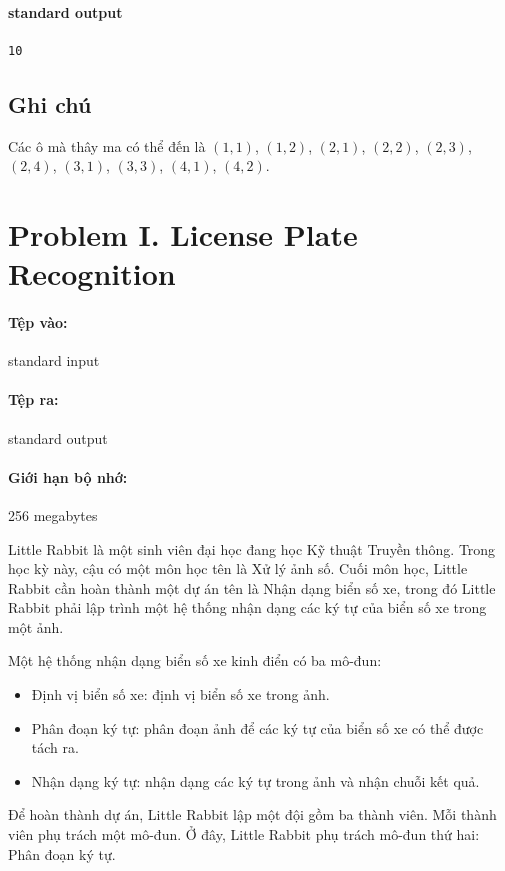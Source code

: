 \documentclass[11pt]{article}
\begin{document}
\paragraph{standard output}
\begin{verbatim}
10
\end{verbatim}

\subsection*{Ghi chú}

Các ô mà thây ma có thể đến là \((1,1)\), \((1,2)\), \((2,1)\), \((2,2)\),
\((2,3)\), \((2,4)\), \((3,1)\), \((3,3)\), \((4,1)\), \((4,2)\).

\section{Problem I. License Plate Recognition}

\paragraph{Tệp vào:} standard input
\paragraph{Tệp ra:} standard output
\paragraph{Giới hạn bộ nhớ:} 256 megabytes

Little Rabbit là một sinh viên đại học đang học Kỹ thuật Truyền thông. Trong
học kỳ này, cậu có một môn học tên là Xử lý ảnh số. Cuối môn học, Little
Rabbit cần hoàn thành một dự án tên là Nhận dạng biển số xe, trong đó Little
Rabbit phải lập trình một hệ thống nhận dạng các ký tự của biển số xe trong
một ảnh.

Một hệ thống nhận dạng biển số xe kinh điển có ba mô-đun:
\begin{itemize}
  \item Định vị biển số xe: định vị biển số xe trong ảnh.
  \item Phân đoạn ký tự: phân đoạn ảnh để các ký tự của biển số xe có thể
  được tách ra.
  \item Nhận dạng ký tự: nhận dạng các ký tự trong ảnh và nhận chuỗi kết quả.
\end{itemize}

Để hoàn thành dự án, Little Rabbit lập một đội gồm ba thành viên. Mỗi thành
viên phụ trách một mô-đun. Ở đây, Little Rabbit phụ trách mô-đun thứ hai:
Phân đoạn ký tự.
\end{document}
